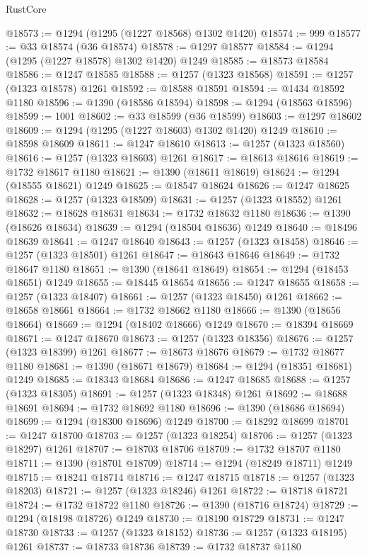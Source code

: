 \begin{lexlean}{RustCore}
\begin{coremodule}
@18573 := @1294 (@1295 (@1227 @18568) @1302 @1420)
@18574 := 999
@18577 := @33 @18574 (@36 @18574)
@18578 := @1297 @18577
@18584 := @1294 (@1295 (@1227 @18578) @1302 @1420) @1249
@18585 := @18573 @18584
@18586 := @1247 @18585
@18588 := @1257 (@1323 @18568)
@18591 := @1257 (@1323 @18578) @1261
@18592 := @18588 @18591
@18594 := @1434 @18592 @1180
@18596 := @1390 (@18586 @18594)
@18598 := @1294 (@18563 @18596)
@18599 := 1001
@18602 := @33 @18599 (@36 @18599)
@18603 := @1297 @18602
@18609 := @1294 (@1295 (@1227 @18603) @1302 @1420) @1249
@18610 := @18598 @18609
@18611 := @1247 @18610
@18613 := @1257 (@1323 @18560)
@18616 := @1257 (@1323 @18603) @1261
@18617 := @18613 @18616
@18619 := @1732 @18617 @1180
@18621 := @1390 (@18611 @18619)
@18624 := @1294 (@18555 @18621) @1249
@18625 := @18547 @18624
@18626 := @1247 @18625
@18628 := @1257 (@1323 @18509)
@18631 := @1257 (@1323 @18552) @1261
@18632 := @18628 @18631
@18634 := @1732 @18632 @1180
@18636 := @1390 (@18626 @18634)
@18639 := @1294 (@18504 @18636) @1249
@18640 := @18496 @18639
@18641 := @1247 @18640
@18643 := @1257 (@1323 @18458)
@18646 := @1257 (@1323 @18501) @1261
@18647 := @18643 @18646
@18649 := @1732 @18647 @1180
@18651 := @1390 (@18641 @18649)
@18654 := @1294 (@18453 @18651) @1249
@18655 := @18445 @18654
@18656 := @1247 @18655
@18658 := @1257 (@1323 @18407)
@18661 := @1257 (@1323 @18450) @1261
@18662 := @18658 @18661
@18664 := @1732 @18662 @1180
@18666 := @1390 (@18656 @18664)
@18669 := @1294 (@18402 @18666) @1249
@18670 := @18394 @18669
@18671 := @1247 @18670
@18673 := @1257 (@1323 @18356)
@18676 := @1257 (@1323 @18399) @1261
@18677 := @18673 @18676
@18679 := @1732 @18677 @1180
@18681 := @1390 (@18671 @18679)
@18684 := @1294 (@18351 @18681) @1249
@18685 := @18343 @18684
@18686 := @1247 @18685
@18688 := @1257 (@1323 @18305)
@18691 := @1257 (@1323 @18348) @1261
@18692 := @18688 @18691
@18694 := @1732 @18692 @1180
@18696 := @1390 (@18686 @18694)
@18699 := @1294 (@18300 @18696) @1249
@18700 := @18292 @18699
@18701 := @1247 @18700
@18703 := @1257 (@1323 @18254)
@18706 := @1257 (@1323 @18297) @1261
@18707 := @18703 @18706
@18709 := @1732 @18707 @1180
@18711 := @1390 (@18701 @18709)
@18714 := @1294 (@18249 @18711) @1249
@18715 := @18241 @18714
@18716 := @1247 @18715
@18718 := @1257 (@1323 @18203)
@18721 := @1257 (@1323 @18246) @1261
@18722 := @18718 @18721
@18724 := @1732 @18722 @1180
@18726 := @1390 (@18716 @18724)
@18729 := @1294 (@18198 @18726) @1249
@18730 := @18190 @18729
@18731 := @1247 @18730
@18733 := @1257 (@1323 @18152)
@18736 := @1257 (@1323 @18195) @1261
@18737 := @18733 @18736
@18739 := @1732 @18737 @1180

\end{coremodule}
\end{lexlean}
